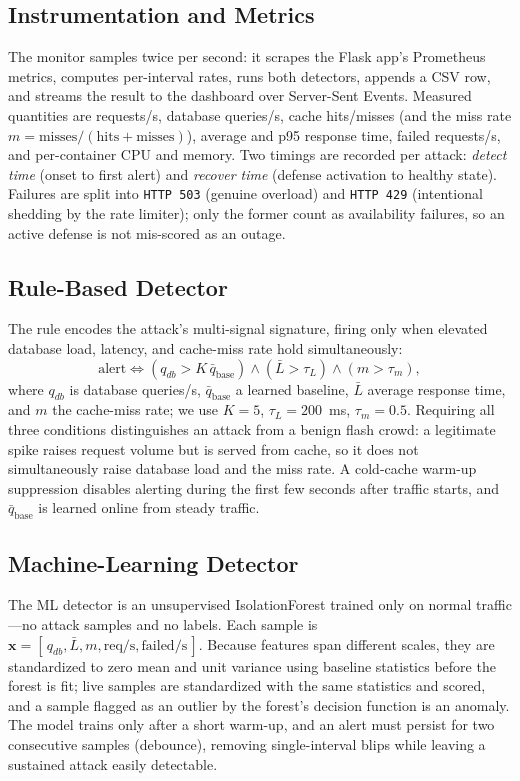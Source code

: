 \documentclass[conference]{IEEEtran}
\begin{document}
\subsection{Instrumentation and Metrics}
The monitor samples twice per second: it scrapes the Flask app's Prometheus metrics,
computes per-interval rates, runs both detectors, appends a CSV row, and streams the
result to the dashboard over Server-Sent Events. Measured quantities are requests/s,
database queries/s, cache hits/misses (and the miss rate $m=\text{misses}/(\text{hits}
+\text{misses})$), average and p95 response time, failed requests/s, and per-container
CPU and memory. Two timings are recorded per attack: \emph{detect time} (onset to
first alert) and \emph{recover time} (defense activation to healthy state). Failures
are split into \texttt{HTTP 503} (genuine overload) and \texttt{HTTP 429}
(intentional shedding by the rate limiter); only the former count as availability
failures, so an active defense is not mis-scored as an outage.

\subsection{Rule-Based Detector}
The rule encodes the attack's multi-signal signature, firing only when elevated
database load, latency, and cache-miss rate hold simultaneously:
\begin{equation}
\mathrm{alert} \iff
(q_{db} > K\,\bar{q}_{\mathrm{base}}) \wedge
(\bar{L} > \tau_L) \wedge
(m > \tau_m),
\label{eq:rule}
\end{equation}
where $q_{db}$ is database queries/s, $\bar{q}_{\mathrm{base}}$ a learned baseline,
$\bar{L}$ average response time, and $m$ the cache-miss rate; we use $K=5$,
$\tau_L=200$~ms, $\tau_m=0.5$. Requiring all three conditions distinguishes an attack
from a benign flash crowd: a legitimate spike raises request volume but is served
from cache, so it does not simultaneously raise database load and the miss rate. A
cold-cache warm-up suppression disables alerting during the first few seconds after
traffic starts, and $\bar{q}_{\mathrm{base}}$ is learned online from steady traffic.

\subsection{Machine-Learning Detector}
The ML detector is an unsupervised IsolationForest \cite{liu2008,pedregosa2011} trained
only on normal traffic---no attack samples and no labels. Each sample is
$\mathbf{x}=[\,q_{db}, \bar{L}, m, \text{req/s}, \text{failed/s}\,]$. Because features
span different scales, they are standardized to zero mean and unit variance using
baseline statistics before the forest is fit; live samples are standardized with the
same statistics and scored, and a sample flagged as an outlier by the forest's
decision function is an anomaly. The model trains only after a short warm-up, and an
alert must persist for two consecutive samples (debounce), removing single-interval
blips while leaving a sustained attack easily detectable.
\end{document}
